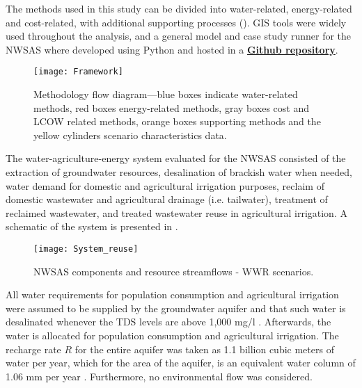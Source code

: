 The methods used in this study can be divided into water-related, energy-related and cost-related, with additional supporting processes (). GIS tools were widely used throughout the analysis, and a general model and case study runner for the NWSAS where developed using Python and hosted in a \href{https://github.com/camiloramirezgo/NWSAS-paper-model}{\textbf{Github repository}}.

\begin{figure*}[!h]
	\centering
	\texttt{[image: Framework]}
	\caption{Methodology flow diagram---blue boxes indicate water-related methods, red boxes energy-related methods, gray boxes cost and LCOW related methods, orange boxes supporting methods and the yellow cylinders scenario characteristics data.}
	\label{fig:framework}
\end{figure*}

The water-agriculture-energy system evaluated for the NWSAS consisted of the extraction of groundwater resources, desalination of brackish water when needed, water demand for domestic and agricultural irrigation purposes, reclaim of domestic wastewater and agricultural drainage (i.e. tailwater), treatment of reclaimed wastewater, and treated wastewater reuse in agricultural irrigation. A schematic of the system is presented in .

\begin{figure*}[!h]
	\centering
	\texttt{[image: System\_reuse]}
	\caption{NWSAS components and resource streamflows - WWR scenarios.}
	\label{fig:system_reuse}
\end{figure*}

All water requirements for population consumption and agricultural irrigation were assumed to be supplied by the groundwater aquifer and that such water is desalinated whenever the TDS levels are above 1,000 mg/l \cite{fao1985water}. Afterwards, the water is allocated for population consumption and agricultural irrigation. 
The recharge rate $R$ for the entire aquifer was taken as 1.1 billion cubic meters of water per year, which for the area of the aquifer, is an equivalent water column of 1.06 mm per year \cite{BetterValorizationIrrigation2015}. Furthermore, no environmental flow was considered.

